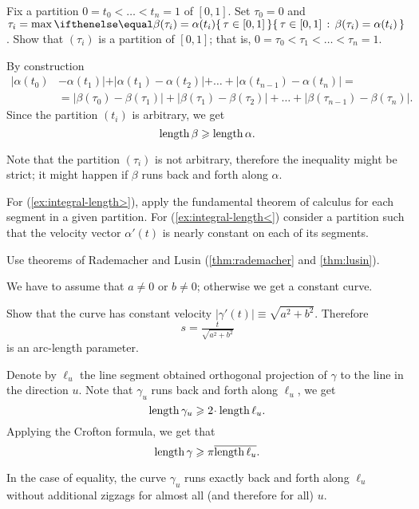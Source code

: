 Fix a partition $0=t_0<\dots <t_n=1$ of $[0,1]$.
Set $\tau_0=0$ and $\tau_i=\max\set{\tau \in[0,1]}{\beta(\tau_i)=\alpha(t_i)}$.
Show that $(\tau_i)$ is a partition of $[0,1]$;
that is, $0=\tau_0<\tau_1<\dots<\tau_n=1$.

By construction 
\begin{align*}
|\alpha(t_0)&-\alpha(t_1)|+|\alpha(t_1)-\alpha(t_2)|+\dots+|\alpha(t_{n-1})-\alpha(t_n)|=
\\
&=
|\beta(\tau_0)-\beta(\tau_1)|+|\beta(\tau_1)-\beta(\tau_2)|+\dots+|\beta(\tau_{n-1})-\beta(\tau_n)|.
\end{align*}
Since the partition $(t_i)$ is arbitrary, we get 
\[\mathop{\rm length}\nolimits \beta\geqslant \mathop{\rm length}\nolimits \alpha.\]

Note that the partition $(\tau_i)$ is not arbitrary, therefore the inequality might be strict; it might happen if $\beta$ runs back and forth along $\alpha$.




 For (\ref{ex:integral-length>}), apply the fundamental theorem of calculus for each segment in a given partition. For (\ref{ex:integral-length<}) consider a partition such that the velocity vector $\alpha'(t)$ is nearly constant on each of its segments.

 Use theorems of Rademacher and Lusin (\ref{thm:rademacher} and \ref{thm:lusin}).


We have to assume that $a\ne 0$ or $b\ne0$;
otherwise we get a constant curve.

Show that the curve has constant velocity $|\gamma'(t)|\equiv \sqrt{a^2+b^2}$.
Therefore 
\[s=\tfrac{t}{\sqrt{a^2+b^2}}\] is an arc-length parameter.



Denote by $\ell_u$ the line segment 
obtained orthogonal projection of $\gamma$ to the line in the direction $u$.
Note that $\gamma_u$ runs back and forth along $\ell_u$, we get 
\[\length\gamma_u\ge 2\cdot\length\ell_u.\]
Applying the Crofton formula, we get that 
\[\mathop{\rm length}\nolimits\gamma\geqslant \pi \overline{\mathop{\rm length}\nolimits\ell_u}.\]

In the case of equality, the curve $\gamma_u$ runs exactly back and forth along $\ell_u$ without additional zigzags for almost all (and therefore for all) $u$.

